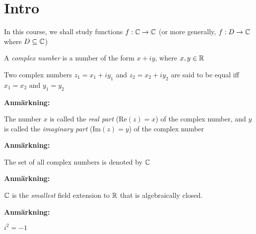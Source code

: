 \section{Intro}
\noindent In this course, we shall study functions $f:\mathbb{C}\to\mathbb{C}$ (or more generally, $f:D\to\mathbb{C}$ where $D\subseteq\mathbb{C}$)
\par\bigskip
\begin{theo}{}
  A \textit{complex number} is a number of the form $x+iy$, where $x,y\in\mathbb{R}$
  \par\bigskip
  \noindent Two complex numbers $z_1 = x_1+iy_1$ and $z_2 = x_2+iy_2$ are said to be equal iff $x_1 = x_2$ and $y_1 = y_2$
\end{theo}
\par\bigskip
\noindent\textbf{Anmärkning:}\par
\noindent The number $x$ is called the \textit{real part} (Re$(z) = x$) of the complex number, and $y$ is called the \textit{imaginary part} (Im$(z) = y$) of the complex number 
\par\bigskip
\noindent\textbf{Anmärkning:}\par
\noindent The set of all complex numbers is denoted by $\mathbb{C}$
\par\bigskip
\noindent\textbf{Anmärkning:}\par
\noindent$\mathbb{C}$ is the \textit{smallest} field extension to $\mathbb{R}$ that is algebraically closed. 
\par\bigskip
\noindent\textbf{Anmärkning:}\par
\noindent $i^2 = -1$
\par\bigskip

